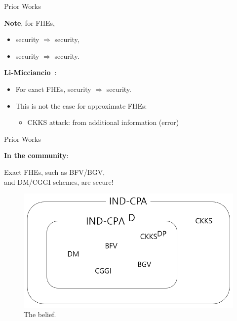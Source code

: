 \documentclass{beamer}
\begin{document}
    \begin{frame}{Prior Works}

    {\bf Note}, for FHEs,
        \begin{itemize}
            \item \indcpad security $\Rightarrow$ \indcpa security, 
            \item \indcpad security $\Rightarrow$ \krd security.
        \end{itemize}\vspace{0.5cm}\pause
    
	{\bf Li-Micciancio~\cite{EC:LiMic21}}: 
    \begin{itemize}
        \item For exact FHEs, \indcpa security $\Rightarrow$ \indcpad security.
        \item This is not the case for approximate FHEs: 
        \begin{itemize}
            \item CKKS \krd attack: from additional information (error)
        \end{itemize}
    \end{itemize}
    \end{frame}
    
    \begin{frame}{Prior Works}
    
    {\bf In the community}: 
    \begin{center}
        Exact FHEs, such as BFV/BGV,\\ and DM/CGGI schemes, are \indcpad secure!
    \end{center}\vspace{0.3cm}

        \begin{figure}[h]
            \centering
            \includegraphics[width=0.7\linewidth]{diagram 1.png}
            \caption{The belief. }
        \end{figure}
    \end{frame}
    
\end{document}
